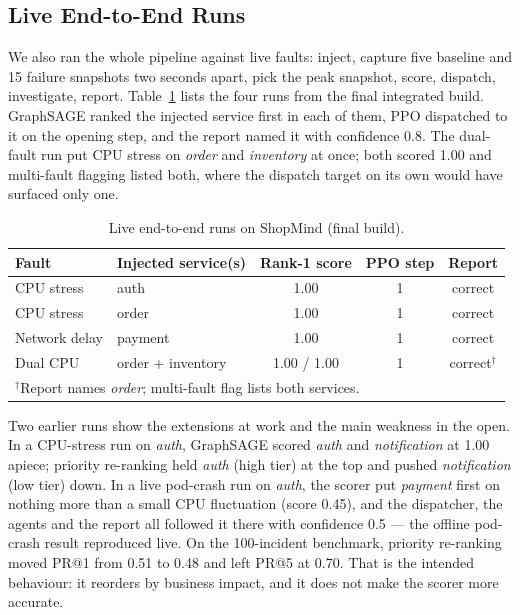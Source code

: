 \documentclass[conference,a4paper]{IEEEtran}
\begin{document}
\subsection{Live End-to-End Runs}
We also ran the whole pipeline against live faults: inject, capture five baseline and 15 failure snapshots two seconds apart, pick the peak snapshot, score, dispatch, investigate, report. Table~\ref{tab:live} lists the four runs from the final integrated build. GraphSAGE ranked the injected service first in each of them, PPO dispatched to it on the opening step, and the report named it with confidence 0.8. The dual-fault run put CPU stress on \emph{order} and \emph{inventory} at once; both scored 1.00 and multi-fault flagging listed both, where the dispatch target on its own would have surfaced only one.

\begin{table}[t]
\centering
\caption{Live end-to-end runs on ShopMind (final build).}
\label{tab:live}
\setlength{\tabcolsep}{3pt}
\begin{tabular}{llccc}
\toprule
Fault & Injected service(s) & Rank-1 score & PPO step & Report \\
\midrule
CPU stress     & auth              & 1.00 & 1 & correct \\
CPU stress     & order             & 1.00 & 1 & correct \\
Network delay  & payment           & 1.00 & 1 & correct \\
Dual CPU       & order + inventory & 1.00 / 1.00 & 1 & correct$^\dagger$ \\
\bottomrule
\multicolumn{5}{l}{\footnotesize $^\dagger$Report names \emph{order}; multi-fault flag lists both services.}
\end{tabular}
\end{table}

Two earlier runs show the extensions at work and the main weakness in the open. In a CPU-stress run on \emph{auth}, GraphSAGE scored \emph{auth} and \emph{notification} at 1.00 apiece; priority re-ranking held \emph{auth} (high tier) at the top and pushed \emph{notification} (low tier) down. In a live pod-crash run on \emph{auth}, the scorer put \emph{payment} first on nothing more than a small CPU fluctuation (score 0.45), and the dispatcher, the agents and the report all followed it there with confidence 0.5 --- the offline pod-crash result reproduced live. On the 100-incident benchmark, priority re-ranking moved PR@1 from 0.51 to 0.48 and left PR@5 at 0.70. That is the intended behaviour: it reorders by business impact, and it does not make the scorer more accurate.
\end{document}
